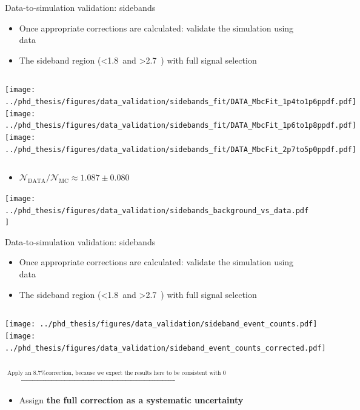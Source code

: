 \documentclass[xcolor=dvipsnames]{beamer}
\begin{document}
\begin{frame}{Data-to-simulation validation: sidebands}
   \scriptsize\centering
   \begin{itemize}
      \item Once appropriate corrections are calculated: validate the simulation using data
      \item The sideband region (\EB<1.8~\gev and \EB>2.7~\gev) with full signal selection
   \end{itemize}

   \begin{columns}
      \centering
      \texttt{[image: ../phd\_thesis/figures/data\_validation/sidebands\_fit/DATA\_MbcFit\_1p4to1p6ppdf.pdf]}
      \centering
      \texttt{[image: ../phd\_thesis/figures/data\_validation/sidebands\_fit/DATA\_MbcFit\_1p6to1p8ppdf.pdf]}
      \centering
      \texttt{[image: ../phd\_thesis/figures/data\_validation/sidebands\_fit/DATA\_MbcFit\_2p7to5p0ppdf.pdf]}
   \end{columns}

   \begin{itemize}
      \item $\mathcal{N}_{\mathrm{DATA}}/\mathcal{N}_{\mathrm{MC}}\approx 1.087\pm 0.080$
   \end{itemize}

   \texttt{[image: ../phd\_thesis/figures/data\_validation/sidebands\_background\_vs\_data.pdf]}

\end{frame}
\begin{frame}{Data-to-simulation validation: sidebands}
   \scriptsize\centering
   \begin{itemize}
      \item Once appropriate corrections are calculated: validate the simulation using data
      \item The sideband region (\EB<1.8~\gev and \EB>2.7~\gev) with full signal selection
   \end{itemize}

   \begin{columns}
      \centering
      \texttt{[image: ../phd\_thesis/figures/data\_validation/sideband\_event\_counts.pdf]}
    \centering
     \texttt{[image: ../phd\_thesis/figures/data\_validation/sideband\_event\_counts\_corrected.pdf]}
   \end{columns}

   $\xrightarrow{\text{Apply an 8.7\% correction, because we expect the results here to be consistent with 0}}$

   \begin{itemize}
      \item Assign \textbf{the full correction as a systematic uncertainty}
   \end{itemize}

\end{frame}
\end{document}
